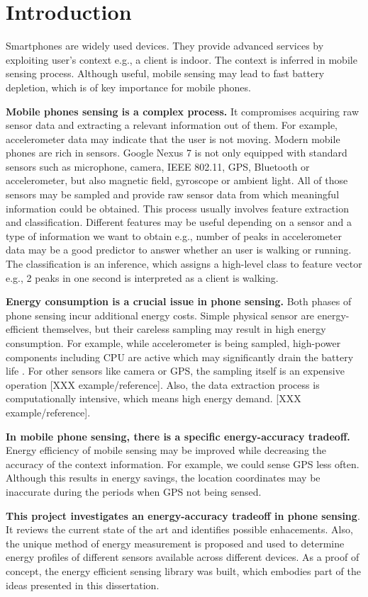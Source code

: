 \section{Introduction}
\label{s:intro}
\hspace{10pt} Smartphones are widely used devices. They provide advanced services by exploiting user's context e.g., a client is indoor. The context is inferred in mobile sensing process. Although useful, mobile sensing may lead to fast battery depletion, which is of key importance for mobile phones. 

\textbf{Mobile phones sensing is a complex process.} It compromises acquiring raw sensor data and extracting a relevant information out of them. For example, accelerometer data may indicate that the user is not moving. Modern mobile phones are rich in sensors. Google Nexus 7 is not only equipped with standard sensors such as microphone, camera, IEEE 802.11, GPS, Bluetooth or accelerometer, but also magnetic field, gyroscope or ambient light. All of those sensors may be sampled and provide raw sensor data from which meaningful information could be obtained. This process usually involves feature extraction and classification. Different features may be useful depending on a sensor and a type of information we want to obtain e.g., number of peaks in accelerometer data may be a good predictor to answer whether an user is walking or running. The classification is an inference, which assigns a high-level class to feature vector e.g., 2 peaks in one second is interpreted as a client is walking.

\textbf{Energy consumption is a crucial issue in phone sensing.} Both phases of phone sensing incur additional energy costs. Simple physical sensor are energy-efficient themselves, but their careless sampling may result in high energy consumption. For example, while accelerometer is being sampled, high-power components including CPU are active which may significantly drain the battery life \cite{priyantha:littlerock}. For other sensors like camera or GPS, the sampling itself is an expensive operation [XXX example/reference]. Also, the data extraction process is computationally intensive, which means high energy demand. [XXX example/reference]. 

\textbf{In mobile phone sensing, there is a specific energy-accuracy tradeoff.} Energy efficiency of mobile sensing may be improved while decreasing the accuracy of the context information. For example, we could sense GPS less often. Although this results in energy savings, the location coordinates may be inaccurate during the periods when GPS not being sensed. 

\textbf{This project investigates an energy-accuracy tradeoff in phone sensing}. It reviews the current state of the art and identifies possible enhacements. Also, the unique method of energy measurement is proposed and used to determine energy profiles of different sensors available across different devices. As a proof of concept, the energy efficient sensing library was built, which embodies part of the ideas presented in this dissertation.